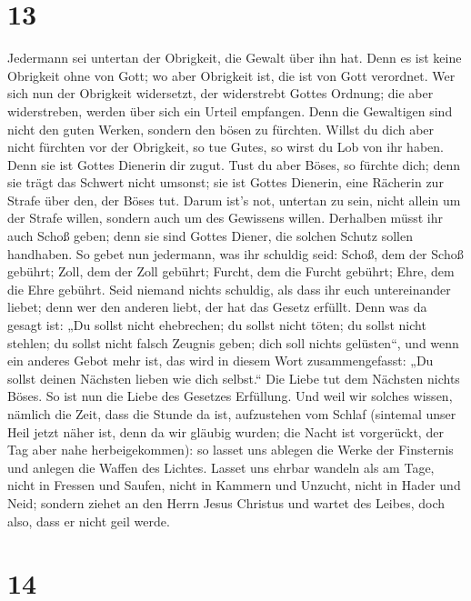 \hypertarget{section-12}{%
\section{13}\label{section-12}}

 Jedermann sei untertan der Obrigkeit, die Gewalt über ihn
hat. Denn es ist keine Obrigkeit ohne von Gott; wo aber Obrigkeit ist,
die ist von Gott verordnet.  Wer sich nun der Obrigkeit
widersetzt, der widerstrebt Gottes Ordnung; die aber widerstreben,
werden über sich ein Urteil empfangen.  Denn die
Gewaltigen sind nicht den guten Werken, sondern den bösen zu fürchten.
Willst du dich aber nicht fürchten vor der Obrigkeit, so tue Gutes, so
wirst du Lob von ihr haben.  Denn sie ist Gottes Dienerin
dir zugut. Tust du aber Böses, so fürchte dich; denn sie trägt das
Schwert nicht umsonst; sie ist Gottes Dienerin, eine Rächerin zur Strafe
über den, der Böses tut.  Darum ist's not, untertan zu
sein, nicht allein um der Strafe willen, sondern auch um des Gewissens
willen.  Derhalben müsst ihr auch Schoß geben; denn sie
sind Gottes Diener, die solchen Schutz sollen handhaben. 
So gebet nun jedermann, was ihr schuldig seid: Schoß, dem der Schoß
gebührt; Zoll, dem der Zoll gebührt; Furcht, dem die Furcht gebührt;
Ehre, dem die Ehre gebührt.  Seid niemand nichts schuldig,
als dass ihr euch untereinander liebet; denn wer den anderen liebt, der
hat das Gesetz erfüllt.  Denn was da gesagt ist: „Du
sollst nicht ehebrechen; du sollst nicht töten; du sollst nicht stehlen;
du sollst nicht falsch Zeugnis geben; dich soll nichts gelüsten``, und
wenn ein anderes Gebot mehr ist, das wird in diesem Wort
zusammengefasst: „Du sollst deinen Nächsten lieben wie dich selbst.``
 Die Liebe tut dem Nächsten nichts Böses. So ist nun die
Liebe des Gesetzes Erfüllung.  Und weil wir solches
wissen, nämlich die Zeit, dass die Stunde da ist, aufzustehen vom Schlaf
(sintemal unser Heil jetzt näher ist, denn da wir gläubig wurden;
 die Nacht ist vorgerückt, der Tag aber nahe
herbeigekommen): so lasset uns ablegen die Werke der Finsternis und
anlegen die Waffen des Lichtes.  Lasset uns ehrbar
wandeln als am Tage, nicht in Fressen und Saufen, nicht in Kammern und
Unzucht, nicht in Hader und Neid;  sondern ziehet an den
Herrn Jesus Christus und wartet des Leibes, doch also, dass er nicht
geil werde.

\hypertarget{section-13}{%
\section{14}\label{section-13}}

